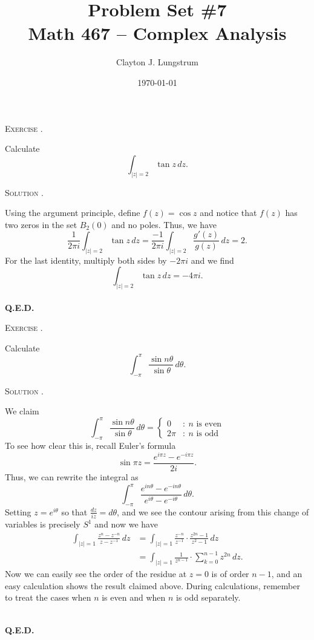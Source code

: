 \documentclass[12pt]{article}
\newcounter{problem}
\renewcommand{\qed}{\hfill\textsc{\textbf{Q.E.D.}}}
\newenvironment{problem}[1][\stepcounter{problem}\theproblem]{\bigskip\noindent\textsc{Exercise #1.}\smallskip\par\begin{itshape}}{\end{itshape}}
\newenvironment{solution}[1][\hspace{-1ex}.]{\medskip\noindent\textsc{Solution #1}\smallskip\par}{\hspace*{\fill}\\ \hspace*{0pt}\qed \clearpage}
\begin{document}
\addtocounter{page}{-1}
\title{Problem Set \#7 \\ Math 467 -- Complex Analysis}
\author{Clayton J. Lungstrum}
\date{\today}
\maketitle
\thispagestyle{empty} %
\clearpage

\begin{problem}
    Calculate
    \[
        \int_{|z|=2}\tan z\,dz.
    \]
\end{problem}

\begin{solution}
    Using the argument principle, define $f(z)=\cos z$ and notice that $f(z)$ has two zeros in the set $B_2(0)$ and no poles. Thus, we have
    \[
        \frac{1}{2\pi i}\int_{|z|=2}\tan z\,dz=\frac{-1}{2\pi i}\int_{|z|=2}\frac{g'(z)}{g(z)}\,dz=2.
    \]
    For the last identity, multiply both sides by $-2\pi i$ and we find
    \[
        \int_{|z|=2}\tan z\,dz=-4\pi i.
    \]
\end{solution}

\begin{problem}
    Calculate
    \[
        \int_{-\pi}^\pi\frac{\sin n\theta}{\sin\theta}\,d\theta.
    \]
\end{problem}

\begin{solution}
    We claim
    \[
        \int_{-\pi}^\pi\frac{\sin n\theta}{\sin\theta}\,d\theta=\begin{cases}
            0 &:\ n\text{ is even}\\
            2\pi &:\ n\text{ is odd}
            \end{cases}
    \]
    To see how clear this is, recall Euler's formula
    \[
        \sin\pi z=\frac{e^{i\pi z}-e^{-i\pi z}}{2i}.
    \]
    Thus, we can rewrite the integral as
    \[
        \int_{-\pi}^\pi\frac{e^{in\theta}-e^{-in\theta}}{e^{i\theta}-e^{-i\theta}}\,d\theta.
    \]
    Setting $z=e^{i\theta}$ so that $\frac{dz}{iz}=d\theta$, and we see the contour arising from this change of variables is precisely $S^1$ and now we have
    \begin{align*}
        \int_{|z|=1}\frac{z^n-z^{-n}}{z-z^{-1}}\,dz&=\int_{|z|=1}\frac{z^{-n}}{z^{-1}}\cdot\frac{z^{2n}-1}{z^2-1}\,dz\\
        &=\int_{|z|=1}\frac{1}{z^{n-1}}\cdot\sum_{k=0}^{n-1}z^{2n}\,dz.
    \end{align*}
    Now we can easily see the order of the residue at $z=0$ is of order $n-1$, and an easy calculation shows the result claimed above. During calculations, remember to treat the cases when $n$ is even and when $n$ is odd separately.
    
\end{solution}
\end{document}

